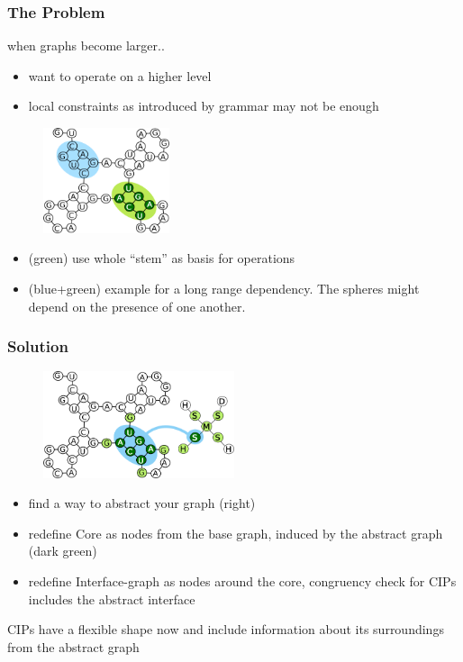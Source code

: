 \documentclass{beamer}
\begin{document}
\begin{frame}
    \frametitle{The Problem}
    when graphs become larger..
    \begin{itemize}
        \item want to operate on a higher level 
        \item local constraints as introduced by grammar may not be enough
    \end{itemize}
   \begin{figure}[h!]
        \centering
        \includegraphics[width=0.33\textwidth]{images/longrangedep.png}
    \end{figure}
    
    \begin{itemize}
        \item (green) use whole ``stem'' as basis for operations
        \item (blue+green) example for a long range dependency. The spheres
            might depend on the presence of one another.
    \end{itemize}
\end{frame}



\begin{frame}
    \frametitle{Solution}
   \begin{figure}[ht]
        \centering
        \includegraphics[width=0.50\textwidth]{images/nucip.png}
    \end{figure}
    \begin{itemize}
        \item find a way to abstract your graph (right)
        \item redefine Core as nodes from the base graph, induced by the 
            abstract graph (dark green)
        \item redefine Interface-graph as nodes around the core,
            congruency check for CIPs includes the abstract interface
   \end{itemize}
   CIPs have a flexible shape now and include information about its surroundings
   from the abstract graph
\end{frame}
\end{document}
